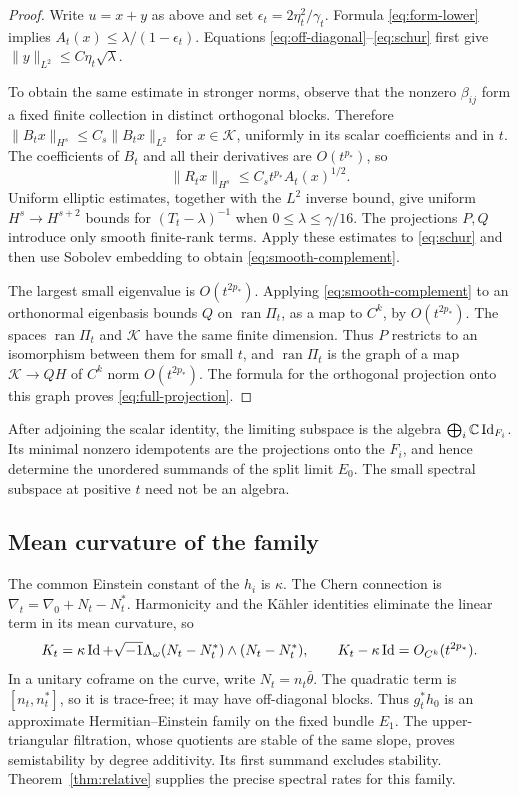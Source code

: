 \begin{proof}
Write $u=x+y$ as above and set $\epsilon_t=2\eta_t^2/\gamma_t$.
Formula \eqref{eq:form-lower} implies
$A_t(x)\le\lambda/(1-\epsilon_t)$. Equations
\eqref{eq:off-diagonal}--\eqref{eq:schur} first give
$\lVert y\rVert_{L^2}\le C\eta_t\sqrt\lambda$.

To obtain the same estimate in stronger norms, observe that the nonzero
$\beta_{ij}$ form a fixed finite collection in distinct orthogonal
blocks. Therefore
$\lVert B_tx\rVert_{H^s}\le C_s\lVert B_tx\rVert_{L^2}$ for
$x\in\mathcal K$, uniformly in its scalar coefficients and in $t$.
The coefficients of $B_t$ and all their derivatives are $O(t^{p_*})$,
so
\[
 \lVert R_tx\rVert_{H^s}\le C_s t^{p_*}A_t(x)^{1/2}.
\]
Uniform elliptic estimates, together with the $L^2$ inverse bound,
give uniform $H^s\to H^{s+2}$ bounds for $(T_t-\lambda)^{-1}$ when
$0\le\lambda\le\gamma/16$. The projections $P,Q$ introduce only
smooth finite-rank terms. Apply these estimates to \eqref{eq:schur}
and then use Sobolev embedding to obtain \eqref{eq:smooth-complement}.

The largest small eigenvalue is $O(t^{2p_*})$. Applying
\eqref{eq:smooth-complement} to an orthonormal eigenbasis bounds $Q$
on $\operatorname{ran}\Pi_t$, as a map to $C^k$, by $O(t^{2p_*})$.
The spaces $\operatorname{ran}\Pi_t$ and $\mathcal K$ have the same
finite dimension. Thus $P$ restricts to an isomorphism between them for
small $t$, and $\operatorname{ran}\Pi_t$ is the graph of a map
$\mathcal K\to QH$ of $C^k$ norm $O(t^{2p_*})$. The formula for
the orthogonal projection onto this graph proves
\eqref{eq:full-projection}.
\end{proof}

After adjoining the scalar identity, the limiting subspace is the
algebra $\bigoplus_i\mathbb C\operatorname{Id}_{F_i}$. Its minimal nonzero idempotents are
the projections onto the $F_i$, and hence determine the unordered
summands of the split limit $E_0$. The small spectral subspace at
positive $t$ need not be an algebra.

\subsection{Mean curvature of the family}

The common Einstein constant of the $h_i$ is $\kappa$. The Chern
connection is $\nabla_t=\nabla_0+N_t-N_t^*$. Harmonicity and the
K\"ahler identities eliminate the linear term in its mean curvature,
so
\begin{equation}\label{eq:several-curvature}
 K_t=\kappa\operatorname{Id}+\sqrt{-1}\Lambda_\omega
       (N_t-N_t^*)\wedge(N_t-N_t^*),
 \qquad K_t-\kappa\operatorname{Id}=O_{C^k}(t^{2p_*}).
\end{equation}
In a unitary coframe on the curve, write $N_t=n_t\bar\theta$.
The quadratic term is $[n_t,n_t^*]$, so it is trace-free; it may have
off-diagonal blocks. Thus $g_t^*h_0$ is an approximate
Hermitian--Einstein family on the fixed bundle $E_1$. The
upper-triangular filtration, whose quotients are stable of the same
slope, proves semistability by degree additivity. Its first summand
excludes stability. Theorem~\ref{thm:relative} supplies the precise
spectral rates for this family.

